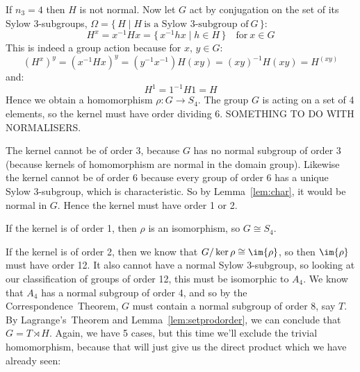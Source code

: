 If \(n_3 = 4\) then \(H\) is not normal.
Now let \(G\) act by conjugation on the set of its Sylow 3-subgroups, \(\Omega = \{\,H \mid H\ \text{is a Sylow
3-subgroup of}\ G\,\}\):
\[H^x = x^{-1}Hx = \{\,x^{-1}hx \mid h \in H\,\} \quad \text{for}\ x \in G\]
This is indeed a group action because for \(x,\,y \in G\):
\[{(H^x)}^y = {(x^{-1}Hx)}^y = (y^{-1}x^{-1})H(xy) = {(xy)}^{-1}H(xy) = H^{(xy)}\]
and:
\[H^1 = 1^{-1}H1 = H\]
Hence we obtain a homomorphism \(\rho:G \to S_4\).
The group \(G\) is acting on a set of 4 elements, so the kernel must have order dividing 6.
SOMETHING TO DO WITH NORMALISERS\@.

The kernel cannot be of order 3, because \(G\) has no normal subgroup of order 3 (because kernels of homomorphism are
normal in the domain group).
Likewise the kernel cannot be of order 6 because every group of order 6 has a unique Sylow 3-subgroup, which is
characteristic.
So by Lemma~\ref{lem:char}, it would be normal in \(G\).
Hence the kernel must have order 1 or 2.

If the kernel is of order 1, then \(\rho\) is an isomorphism, so \(G \cong S_4\).

If the kernel is of order 2, then we know that \(G/\ker{\rho} \cong \im{\rho}\), so then \(\im{\rho}\) must have order
12.
It also cannot have a normal Sylow 3-subgroup, so looking at our classification of groups of order 12, this must be
isomorphic to \(A_4\).
We know that \(A_4\) has a normal subgroup of order 4, and so by the Correspondence~Theorem, \(G\) must contain a normal
subgroup of order 8, say \(T\).
By Lagrange's~Theorem and Lemma~\ref{lem:setprodorder}, we can conclude that \(G = T \rtimes H\).
Again, we have 5 cases, but this time we'll exclude the trivial homomorphism, because that will just give us the direct
product which we have already seen:


